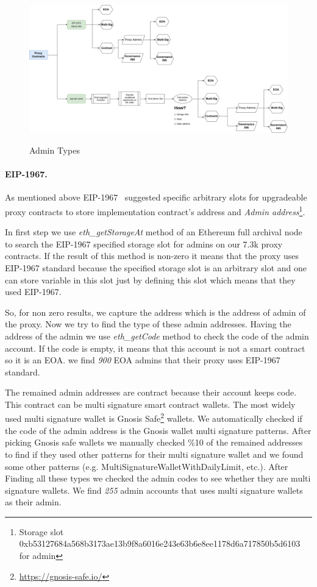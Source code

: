\begin{figure}
  \centering
  \includegraphics[width=1.0\textwidth]{figures/Admins.png}\label{Admins}
  \caption{Admin Types}
\end{figure}

\paragraph{EIP-1967.}As mentioned above EIP-1967~\cite{eip1967} suggested specific arbitrary slots for upgradeable proxy contracts to store implementation contract's address and \textit{Admin address}\footnote{Storage slot 0xb53127684a568b3173ae13b9f8a6016e243e63b6e8ee1178d6a717850b5d6103 for admin}.

In first step we use \textit{eth\_getStorageAt} method of an Ethereum full archival node to search the EIP-1967 specified storage slot for admins on our 7.3k proxy contracts. If the result of this method is non-zero it means that the proxy uses EIP-1967 standard because the specified storage slot is an arbitrary slot and one can store variable in this slot just by defining this slot which means that they used EIP-1967.

So, for non zero results, we capture the address which is the address of admin of the proxy. Now we try to find the type of these admin addresses. Having the address of the admin we use \textit{eth\_getCode} method to check the code of the admin account. If the code is empty, it means that this account is not a smart contract so it is an EOA. we find \textit{900} EOA admins that their proxy uses EIP-1967 standard.

The remained admin addresses are contract because their account keeps code. This contract can be multi signature smart contract wallets. The most widely used multi signature wallet is Gnosis Safe\footnote{\url{https://gnosis-safe.io/}} wallets. We automatically checked if the code of the admin address is the Gnosis wallet multi signature patterns. After picking Gnosis safe wallets we manually checked \%10 of the remained addresses to find if they used other patterns for their multi signature wallet and we found some other patterns (e.g. MultiSignatureWalletWithDailyLimit, etc.). After Finding all these types we checked the admin codes to see whether they are multi signature wallets. We find \textit{255} admin accounts that uses multi signature wallets as their admin.

